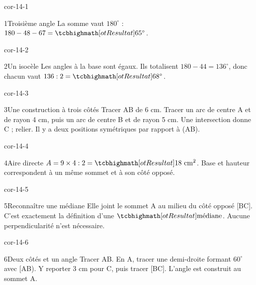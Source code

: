 \clearpage\pagestyle{otMain}\setlength{\otBlocEspacement}{2.5mm}\fontsize{11}{15}\selectfont{}
\begin{blocLivre}{cor-14-1}\begin{corrige}{1}{Troisième angle}
La somme vaut $180^\circ$ : $180-48-67=\res{65^\circ}$.
\label{fig-cor-14-1}
\end{corrige}\end{blocLivre}
\begin{blocLivre}{cor-14-2}\begin{corrige}{2}{Un isocèle}
Les angles à la base sont égaux. Ils totalisent $180-44=136^\circ$, donc chacun vaut $136:2=\res{68^\circ}$.
\label{fig-cor-14-2}
\end{corrige}\end{blocLivre}
\begin{blocLivre}{cor-14-3}\begin{corrige}{3}{Une construction à trois côtés}
Tracer AB de 6 cm. Tracer un arc de centre A et de rayon 4 cm, puis un arc de centre B et de rayon 5 cm. Une intersection donne C ; relier. Il y a deux positions symétriques par rapport à (AB).
\label{fig-cor-14-3}
\end{corrige}\end{blocLivre}
\begin{blocLivre}{cor-14-4}\begin{corrige}{4}{Aire directe}
$A=9\times4:2=\res{18\ \mathrm{cm}^2}$. Base et hauteur correspondent à un même sommet et à son côté opposé.
\label{fig-cor-14-4}
\end{corrige}\end{blocLivre}
\begin{blocLivre}{cor-14-5}\begin{corrige}{5}{Reconnaître une médiane}
Elle joint le sommet A au milieu du côté opposé [BC]. C’est exactement la définition d’une $\res{\text{médiane}}$. Aucune perpendicularité n’est nécessaire.
\label{fig-cor-14-5}
\end{corrige}\end{blocLivre}
\begin{blocLivre}{cor-14-6}\begin{corrige}{6}{Deux côtés et un angle}
Tracer AB. En A, tracer une demi-droite formant $60^\circ$ avec [AB). Y reporter 3 cm pour C, puis tracer [BC]. L’angle est construit au sommet A.
\label{fig-cor-14-6}
\end{corrige}\end{blocLivre}
